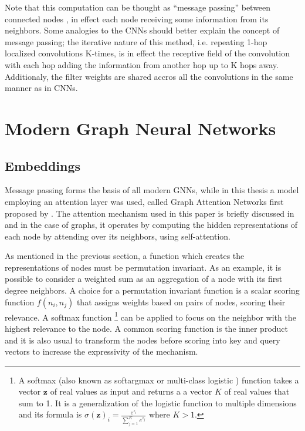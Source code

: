 Note that this computation can be thought as ``message passing'' between
connected nodes \cite{article:messageP}, in effect each node receiving some
information from its neighbors. Some analogies to the CNNs should better explain
the concept of message passing; the iterative nature of this method, i.e. repeating
1-hop localized convolutions K-times, is in effect the receptive field of the convolution
with each hop adding the information from another hop up to K hops away. Additionaly,
the filter weights are shared accros all the convolutions in the same manner as in
CNNs.


\section{Modern Graph Neural Networks}

\subsection{Embeddings}

Message passing forms the basis of all modern GNNs, while in this
thesis a model employing an attention layer was used, called Graph
Attention Networks first proposed by \citet{velickovic2017graph}.  The
attention \cite{article:attention} mechanism used in this paper is
briefly discussed in  and in the case of
graphs, it operates by computing the hidden representations of each
node by attending over its neighbors, using self-attention.

As mentioned in the previous section, a function which creates
the representations of nodes must be permutation invariant. As an
example, it is possible to consider a weighted sum as an aggregation
of a node with its first degree neighbors. A choice for a permutation
invariant function is a scalar scoring function $f(n_i, n_j)$ that
assigns weights based on pairs of nodes, scoring their relevance.
A softmax function \footnote{ A softmax (also known as softargmax or
  multi-class logistic ) function takes a vector $\bm{z}$ of real values
  as input and returns a a vector $K$ of real values that sum to 1. It
  is a generalization of the logistic function to multiple dimensions and
  its formula is $\sigma(\bm{z})_i = \frac{e^{z_i}}{\sum_{j=1}^K e^{z_j}}$
  where $K>1$.
} can be applied to focus on the neighbor with the highest relevance to the
node. A common scoring function is the inner product and it is also usual
to transform the nodes before scoring into key and query vectors to increase
the expressivity of the mechanism. 

